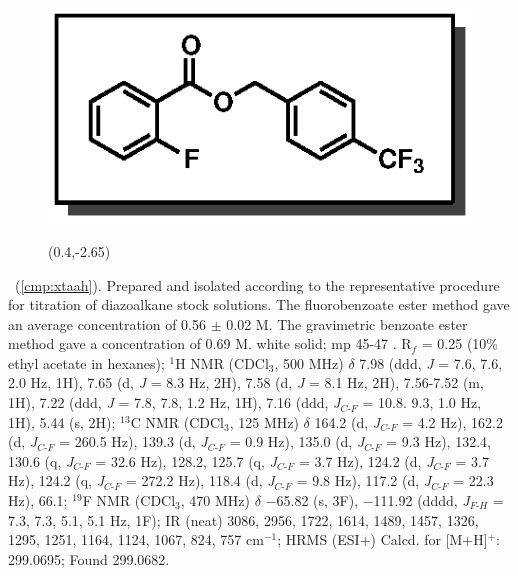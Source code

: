 \pagebreak
\begin{figure}
  \vspace{-18pt}
  \begin{center}
    \includegraphics[scale=0.8]{chp_asymmetric/images/xtaah}
          \begin{textblock}{1}(0.4,-2.65)  \end{textblock}
  \end{center}
  \vspace{-35pt}
\end{figure}\noindent \textbf{\CMPxtaah}\ (\ref{cmp:xtaah}). Prepared and
isolated according to the representative procedure for titration of diazoalkane
stock solutions. The fluorobenzoate ester method gave an average concentration
of 0.56 $\pm$ 0.02 M. The gravimetric benzoate ester method gave a concentration
of 0.69 M. white solid; mp 45-47 \degc. R$_f$ = 0.25 (10\% ethyl acetate in
hexanes); $^1$H NMR (CDCl$_3$, 500 MHz) $\delta$ 7.98 (ddd, \textit{J} = 7.6, 7.6, 2.0 Hz, 1H),
7.65 (d, \textit{J} = 8.3 Hz, 2H), 7.58 (d, \textit{J} = 8.1 Hz, 2H), 7.56-7.52
(m, 1H), 7.22 (ddd, \textit{J} = 7.8, 7.8, 1.2 Hz, 1H), 7.16 (ddd,
\textit{J}$_{C\mbox{-}F}$ = 10.8. 9.3, 1.0 Hz, 1H), 5.44 (s, 2H); $^{13}$C NMR
(CDCl$_3$, 125 MHz) $\delta$ 164.2 (d, \textit{J}$_{C\mbox{-}F}$ = 4.2 Hz),
162.2 (d, \textit{J}$_{C\mbox{-}F}$ = 260.5 Hz), 139.3 (d,
\textit{J}$_{C\mbox{-}F}$ = 0.9 Hz), 135.0 (d, \textit{J}$_{C\mbox{-}F}$ = 9.3
Hz), 132.4, 130.6 (q, \textit{J}$_{C\mbox{-}F}$ = 32.6 Hz), 128.2, 125.7 (q,
\textit{J}$_{C\mbox{-}F}$ = 3.7 Hz), 124.2 (d, \textit{J}$_{C\mbox{-}F}$ = 3.7
Hz), 124.2 (q, \textit{J}$_{C\mbox{-}F}$ = 272.2 Hz), 118.4 (d,
\textit{J}$_{C\mbox{-}F}$ = 9.8 Hz), 117.2 (d, \textit{J}$_{C\mbox{-}F}$ = 22.3
Hz), 66.1; $^{19}$F NMR (CDCl$_3$, 470 MHz) $\delta$ $-$65.82 (s, 3F), $-$111.92
(dddd, \textit{J}$_{F\mbox{-}H}$ = 7.3, 7.3, 5.1, 5.1 Hz, 1F); IR (neat) 3086,
2956, 1722, 1614, 1489, 1457, 1326, 1295, 1251, 1164, 1124, 1067, 824, 757
cm$^{-1}$; HRMS (ESI+) Calcd. for  [M+H]$^+$: 299.0695; Found
299.0682.

